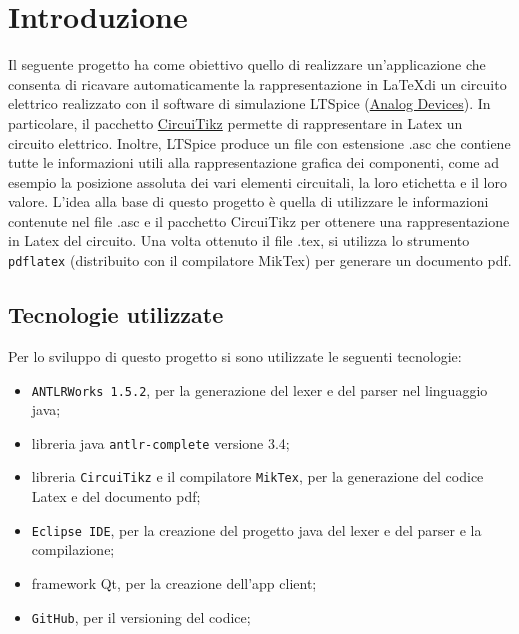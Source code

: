 \section{Introduzione}

Il seguente progetto ha come obiettivo quello di realizzare un'applicazione che consenta di ricavare automaticamente la rappresentazione in \LaTeX \;di un circuito elettrico realizzato con il software di simulazione LTSpice (\href{https://www.analog.com/en/design-center/design-tools-and-calculators/ltspice-simulator.html}{Analog Devices}). In particolare, il pacchetto \href{https://it.overleaf.com/learn/latex/CircuiTikz_package}{CircuiTikz} permette di rappresentare in Latex un circuito elettrico. Inoltre, LTSpice produce un file con estensione .asc che contiene tutte le informazioni utili alla rappresentazione grafica dei componenti, come ad esempio la posizione assoluta dei vari elementi circuitali, la loro etichetta e il loro valore. L'idea alla base di questo progetto è quella di utilizzare le informazioni contenute nel file .asc e il pacchetto CircuiTikz per ottenere una rappresentazione in Latex del circuito. Una volta ottenuto il file .tex, si utilizza lo strumento \texttt{pdflatex} (distribuito con il compilatore MikTex) per generare un documento pdf.
\subsection{Tecnologie utilizzate}
Per lo sviluppo di questo progetto si sono utilizzate le seguenti tecnologie:
\begin{itemize}
	\item \texttt{ANTLRWorks 1.5.2}, per la generazione del lexer e del parser nel linguaggio java;
	\item libreria java \texttt{antlr-complete} versione 3.4;
	\item libreria \texttt{CircuiTikz} e il compilatore \texttt{MikTex}, per la generazione del codice Latex e del documento pdf;
	\item \texttt{Eclipse IDE}, per la creazione del progetto java del lexer e del parser e la compilazione;
	\item framework Qt, per la creazione dell'app client;
	\item \texttt{GitHub}, per il versioning del codice;
\end{itemize}
